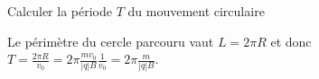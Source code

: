 
\begin{enonce}
Calculer la période $T$ du mouvement circulaire
\end{enonce}


\begin{corrige}
Le périmètre du cercle parcouru vaut $L=2\pi R$ et donc $T=\frac{2\pi R}{v_0}=2\pi \frac{mv_0}{|q|B}\frac{1}{v_0}=2\pi \frac{m}{|q|B}$.
\end{corrige}



\finEntrainement




\newpage







\hauteurLargeurCadreReponse		{8mm}{3cm}
\typeEntrainement				{} %
\initialisationEntrainement


\debutEntrainement



